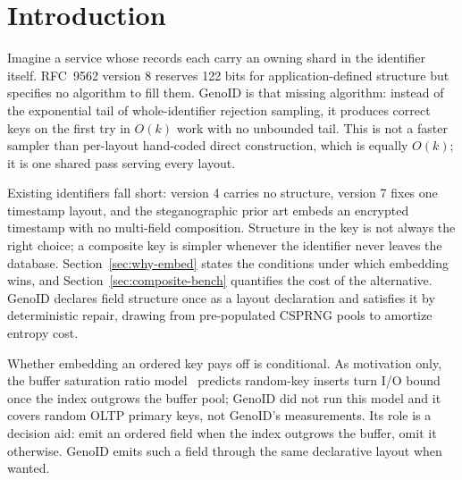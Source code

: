 \documentclass{svproc}
\begin{document}
\section{Introduction}

Imagine a service whose records each carry an owning shard in the identifier itself. RFC~9562 version 8 reserves 122 bits for application-defined structure but specifies no algorithm to fill them. GenoID is that missing algorithm: instead of the exponential tail of whole-identifier rejection sampling, it produces correct keys on the first try in $O(k)$ work with no unbounded tail. This is not a faster sampler than per-layout hand-coded direct construction, which is equally $O(k)$; it is one shared pass serving every layout.

Existing identifiers fall short: version 4 carries no structure, version 7 fixes one timestamp layout, and the steganographic prior art embeds an encrypted timestamp with no multi-field composition. Structure in the key is not always the right choice; a composite key is simpler whenever the identifier never leaves the database. Section~\ref{sec:why-embed} states the conditions under which embedding wins, and Section~\ref{sec:composite-bench} quantifies the cost of the alternative. GenoID declares field structure once as a layout declaration and satisfies it by deterministic repair, drawing from pre-populated CSPRNG pools to amortize entropy cost.

Whether embedding an ordered key pays off is conditional. As motivation only, the buffer saturation ratio model~\cite{27} predicts random-key inserts turn I/O bound once the index outgrows the buffer pool; GenoID did not run this model and it covers random OLTP primary keys, not GenoID's measurements. Its role is a decision aid: emit an ordered field when the index outgrows the buffer, omit it otherwise. GenoID emits such a field through the same declarative layout when wanted.
\end{document}
